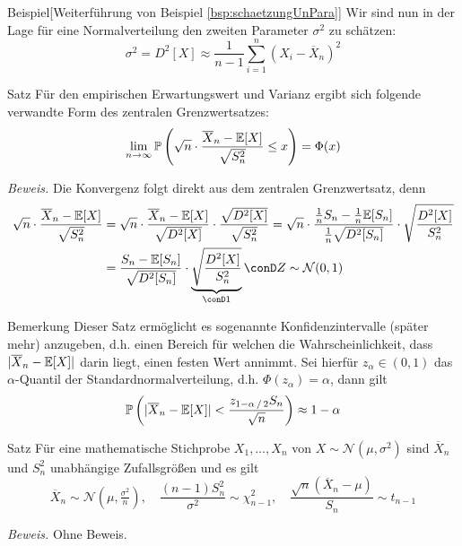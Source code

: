 \begin{colbox}{Beispiel}[Weiterführung von Beispiel \ref{bsp:schaetzungUnPara}]
    Wir sind nun in der Lage für eine Normalverteilung den zweiten Parameter $\sigma^2$ zu schätzen:
    \[
        \sigma^2 = D^2[X] \approx\dfrac{1}{n-1}\sum_{i=1}^{n}(X_i-\overline{X}_n)^2
    \]
\end{colbox}

\begin{colbox}{Satz}
    Für den empirischen Erwartungswert und Varianz ergibt sich folgende verwandte Form des zentralen Grenzwertsatzes:
    \[
        \lim_{n\to\infty} \mathbb P\left(\sqrt{n}\cdot\dfrac{\overline{X}_n-\mathbb E[X]}{\sqrt{S_n^2}}\leq x\right) = \Phi(x)
    \]
\end{colbox}
\textit{Beweis.} Die Konvergenz folgt direkt aus dem zentralen Grenzwertsatz, denn 
\begin{align*}
    \sqrt{n}\cdot\dfrac{\overline{X}_n-\E[X]}{\sqrt{S_n^2}} 
    &= \sqrt{n}\cdot\dfrac{\overline{X}_n-\E[X]}{\sqrt{D^2[X]}} \cdot \dfrac{\sqrt{D^2[X]}}{\sqrt{S_n^2}}
    = \sqrt{n}\cdot\dfrac{\tfrac{1}{n}S_n-\tfrac{1}{n}\E[S_n]}{\tfrac{1}{n}\sqrt{D^2[S_n]}} \cdot \sqrt{\dfrac{D^2[X]}{S_n^2}}\\
    &= \dfrac{S_n-\E[S_n]}{\sqrt{D^2[S_n]}} \cdot \underbrace{\sqrt{\dfrac{D^2[X]}{S_n^2}}}_{\conD 1}
    \conD Z\sim\mathcal{N}(0,1)
\end{align*}

\begin{colbox}{Bemerkung}
    Dieser Satz ermöglicht es sogenannte Konfidenzintervalle (später mehr) anzugeben, d.h. einen Bereich für 
    welchen die Wahrscheinlichkeit, dass $|\overline{X}_n-\mathbb E[X]|$ darin liegt, einen festen Wert annimmt. 
    Sei hierfür $z_\alpha\in(0,1)$ das $\alpha$-Quantil der Standardnormalverteilung, d.h. $\Phi(z_\alpha)=\alpha$, 
    dann gilt 
    \[
        \mathbb P\left(|\overline{X}_n-\mathbb E[X]|<\dfrac{z_{1-\alpha\,/\,2}S_n}{\sqrt{n}}\right) \approx 1-\alpha
    \] 
\end{colbox}

\begin{colbox}{Satz}
    Für eine mathematische Stichprobe $X_1,\dots,X_n$ von $X\sim\mathcal{N}(\mu,\sigma^2)$ sind $\overline{X}_n$ und 
    $S_n^2$ unabhängige Zufallsgrößen und es gilt
    \[
        \overline{X}_n\sim\mathcal{N}(\mu,\tfrac{\sigma^2}{n}), \quad
        \dfrac{(n-1)S_n^2}{\sigma^2}\sim\chi^2_{n-1}, \quad
        \dfrac{\sqrt{n}(\overline{X}_n-\mu)}{S_n}\sim t_{n-1}
    \]
\end{colbox}
\textit{Beweis.} Ohne Beweis.


